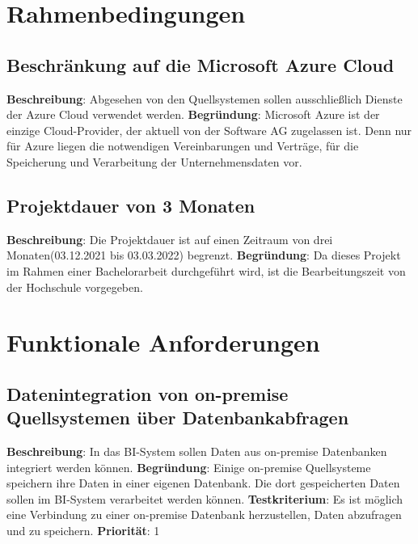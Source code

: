 \section{Rahmenbedingungen} 

\subsection{Beschränkung auf die Microsoft Azure Cloud} \label{sec:anforderungsspezifikation:azureCloud}
\textbf{Beschreibung}: Abgesehen von den Quellsystemen sollen ausschließlich Dienste der Azure Cloud verwendet werden.
\newline \textbf{Begründung}: Microsoft Azure ist der einzige Cloud-Provider, der aktuell von der Software AG zugelassen ist. Denn nur für Azure liegen die notwendigen Vereinbarungen und Verträge, für die Speicherung und Verarbeitung der Unternehmensdaten vor.

\subsection{Projektdauer von 3 Monaten} \label{sec:anforderungsspezifikation:projektDauer}
\textbf{Beschreibung}: Die Projektdauer ist auf einen Zeitraum von drei Monaten(03.12.2021 bis 03.03.2022) begrenzt.
\newline \textbf{Begründung}: Da dieses Projekt im Rahmen einer Bachelorarbeit durchgeführt wird, ist die Bearbeitungszeit von der Hochschule vorgegeben.

\section{Funktionale Anforderungen} 

\subsection{Datenintegration von on-premise Quellsystemen über Datenbankabfragen} \label{sec:anforderungsspezifikation:datenintegrationOnPremDB}
\textbf{Beschreibung}: In das BI-System sollen Daten aus on-premise Datenbanken integriert werden können.
\newline \textbf{Begründung}: Einige on-premise Quellsysteme speichern ihre Daten in einer eigenen Datenbank. Die dort gespeicherten Daten sollen im BI-System verarbeitet werden können.
\newline \textbf{Testkriterium}: Es ist möglich eine Verbindung zu einer on-premise Datenbank herzustellen, Daten abzufragen und zu speichern.
\newline \textbf{Priorität}: 1


